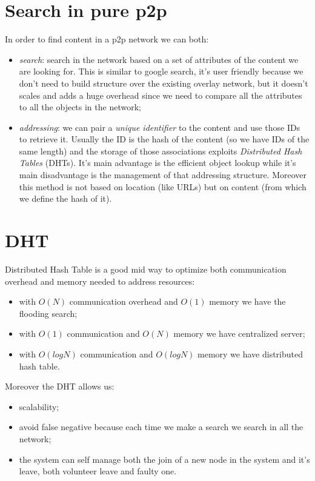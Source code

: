 \section{Search in pure p2p}
In order to find content in a p2p network we can both:
\begin{itemize}
    \item \emph{search}: search in the network based on a set of attributes of the content we are looking for.
    This is similar to google search, it's user friendly because we don't need to build structure over the existing overlay network, but it doesn't scales and adds a huge overhead since we need to compare all the attributes to all the objects in the network;

    \item \emph{addressing}: we can pair a \emph{unique identifier} to the content and use those IDs to retrieve it.
    Usually the ID is the hash of the content (so we have IDs of the same length) and the storage of those associations exploits \emph{Distributed Hash Tables} (DHTs).
    It's main advantage is the efficient object lookup while it's main disadvantage is the management of that addressing structure.
    Moreover this method is not based on location (like URLs) but on content (from which we define the hash of it).
\end{itemize}

\section{DHT}
Distributed Hash Table is a good mid way to optimize both communication overhead and memory needed to address resources:
\begin{itemize}
    \item with $O(N)$ communication overhead and $O(1)$ memory we have the flooding search;
    \item with $O(1)$ communication and $O(N)$ memory we have centralized server;
    \item with $O(log N)$ communication and $O(log N)$ memory we have distributed hash table.
\end{itemize}

Moreover the DHT allows us:
\begin{itemize}
    \item scalability;
    \item avoid false negative because each time we make a search we search in all the network;
    \item the system can self manage both the join of a new node in the system and it's leave, both volunteer leave and faulty one.
\end{itemize}

